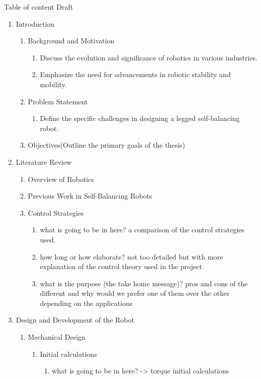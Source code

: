 Table of content Draft
\begin{enumerate}
	\item Introduction
	\begin{enumerate}
		\item Background and Motivation
		\begin{enumerate}
			\item Discuss the evolution and significance of robotics in various industries.
			\item Emphasize the need for advancements in robotic stability and mobility.
		\end{enumerate}

		\item Problem Statement
		\begin{enumerate}
			\item Define the specific challenges in designing a legged self-balancing robot.
		\end{enumerate}
		\item Objectives(Outline the primary goals of the thesis)
	\end{enumerate}
	\item Literature Review
	\begin{enumerate}
		\item Overview of Robotics
		\item Previous Work in Self-Balancing Robots
		\item Control Strategies
		\begin{enumerate}
			\item what is going to be in here? a comparison of the control strategies used.
			\item how long or how elaborate? not too detailed but with more explanation of the control theory used in the project
			\item what is the purpose (the take home message)? pros and cons of the different and why would we prefer one of them over the other depending on the applications
		\end{enumerate}
	\end{enumerate}
	\item Design and Development of the Robot
	\begin{enumerate}
		\item Mechanical Design
		\begin{enumerate}
			\item Initial calculations
			\begin{enumerate}
				\item what is going to be in here? -> torque initial calculations

\end{enumerate}
\end{enumerate}
\end{enumerate}
\end{enumerate}
